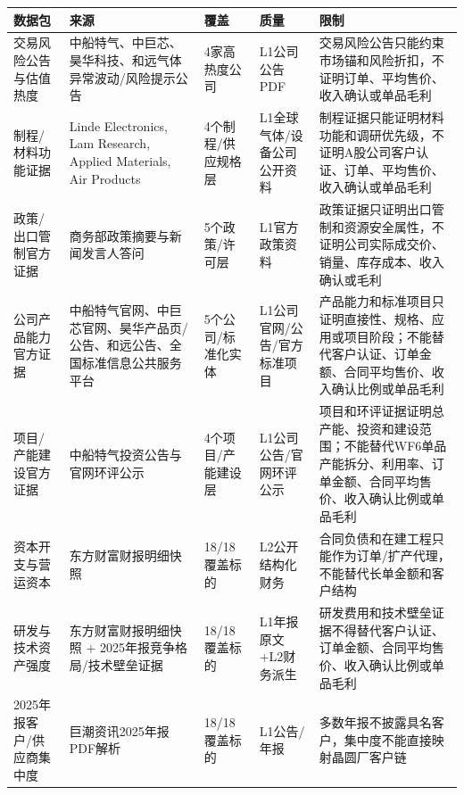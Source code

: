 \begin{exhibitbox}[结构化数据源健康（6）]
\scriptsize
\begin{tabularx}{\exhibitboxwidth}{L{2.1cm} L{2.4cm} L{2.4cm} L{1.5cm} X}
\toprule
\textbf{数据包} & \textbf{来源} & \textbf{覆盖} & \textbf{质量} & \textbf{限制} \\
\midrule
交易风险公告与估值热度 & 中船特气、中巨芯、昊华科技、和远气体异常波动/风险提示公告 & 4家高热度公司 & L1公司公告PDF & 交易风险公告只能约束市场锚和风险折扣，不证明订单、平均售价、收入确认或单品毛利 \\
制程/材料功能证据 & Linde Electronics, Lam Research, Applied Materials, Air Products & 4个制程/供应规格层 & L1全球气体/设备公司公开资料 & 制程证据只能证明材料功能和调研优先级，不证明A股公司客户认证、订单、平均售价、收入确认或单品毛利 \\
政策/出口管制官方证据 & 商务部政策摘要与新闻发言人答问 & 5个政策/许可层 & L1官方政策资料 & 政策证据只证明出口管制和资源安全属性，不证明公司实际成交价、销量、库存成本、收入确认或毛利 \\
公司产品能力官方证据 & 中船特气官网、中巨芯官网、昊华产品页/公告、和远公告、全国标准信息公共服务平台 & 5个公司/标准化实体 & L1公司官网/公告/官方标准项目 & 产品能力和标准项目只证明直接性、规格、应用或项目阶段；不能替代客户认证、订单金额、合同平均售价、收入确认比例或单品毛利 \\
项目/产能建设官方证据 & 中船特气投资公告与官网环评公示 & 4个项目/产能建设层 & L1公司公告/官网环评公示 & 项目和环评证据证明总产能、投资和建设范围；不能替代WF6单品产能拆分、利用率、订单金额、合同平均售价、收入确认比例或单品毛利 \\
资本开支与营运资本 & 东方财富财报明细快照 & 18/18覆盖标的 & L2公开结构化财务 & 合同负债和在建工程只能作为订单/扩产代理，不能替代长单金额和客户结构 \\
研发与技术资产强度 & 东方财富财报明细快照 + 2025年报竞争格局/技术壁垒证据 & 18/18覆盖标的 & L1年报原文+L2财务派生 & 研发费用和技术壁垒证据不得替代客户认证、订单金额、合同平均售价、收入确认比例或单品毛利 \\
2025年报客户/供应商集中度 & 巨潮资讯2025年报PDF解析 & 18/18覆盖标的 & L1公告/年报 & 多数年报不披露具名客户，集中度不能直接映射晶圆厂客户链 \\
\bottomrule
\end{tabularx}
\end{exhibitbox}

